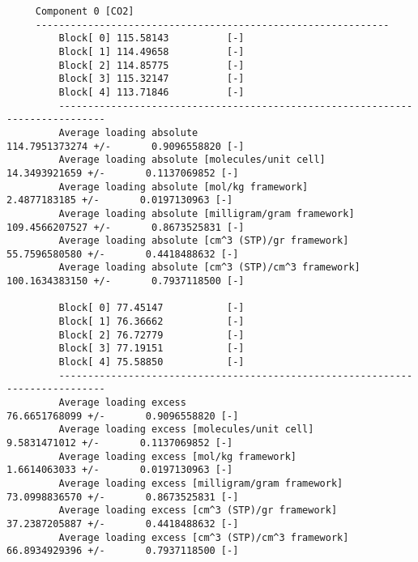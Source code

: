 \begin{tiny}
\begin{verbatim}
     Component 0 [CO2]
     -------------------------------------------------------------
         Block[ 0] 115.58143          [-]
         Block[ 1] 114.49658          [-]
         Block[ 2] 114.85775          [-]
         Block[ 3] 115.32147          [-]
         Block[ 4] 113.71846          [-]
         ------------------------------------------------------------------------------
         Average loading absolute                            114.7951373274 +/-       0.9096558820 [-]
         Average loading absolute [molecules/unit cell]       14.3493921659 +/-       0.1137069852 [-]
         Average loading absolute [mol/kg framework]                  2.4877183185 +/-       0.0197130963 [-]
         Average loading absolute [milligram/gram framework]        109.4566207527 +/-       0.8673525831 [-]
         Average loading absolute [cm^3 (STP)/gr framework]          55.7596580580 +/-       0.4418488632 [-]
         Average loading absolute [cm^3 (STP)/cm^3 framework]       100.1634383150 +/-       0.7937118500 [-]

         Block[ 0] 77.45147           [-]
         Block[ 1] 76.36662           [-]
         Block[ 2] 76.72779           [-]
         Block[ 3] 77.19151           [-]
         Block[ 4] 75.58850           [-]
         ------------------------------------------------------------------------------
         Average loading excess                             76.6651768099 +/-       0.9096558820 [-]
         Average loading excess [molecules/unit cell]        9.5831471012 +/-       0.1137069852 [-]
         Average loading excess [mol/kg framework]                    1.6614063033 +/-       0.0197130963 [-]
         Average loading excess [milligram/gram framework]           73.0998836570 +/-       0.8673525831 [-]
         Average loading excess [cm^3 (STP)/gr framework]            37.2387205887 +/-       0.4418488632 [-]
         Average loading excess [cm^3 (STP)/cm^3 framework]          66.8934929396 +/-       0.7937118500 [-]
\end{verbatim}
\end{tiny}

